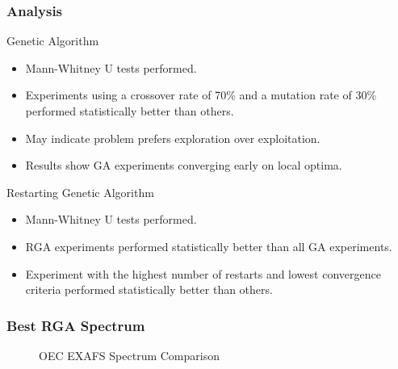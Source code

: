 \documentclass[10pt]{beamer}
\begin{document}
\begin{frame}
	\frametitle{Analysis}

	Genetic Algorithm

	\begin{itemize}
		\item Mann-Whitney U tests performed.
		\item Experiments using a crossover rate of 70\% and a mutation rate of 30\% performed statistically better than others.
		\item May indicate problem prefers exploration over exploitation.
		\item Results show GA experiments converging early on local optima.
	\end{itemize}

	Restarting Genetic Algorithm
	
	\begin{itemize}
		\item Mann-Whitney U tests performed.
		\item RGA experiments performed statistically better than all GA experiments.
		\item Experiment with the highest number of restarts and lowest convergence criteria performed statistically better than others.
	\end{itemize}

\end{frame}

\begin{frame}
	\frametitle{Best RGA Spectrum}

	\begin{figure}
		\caption{OEC EXAFS Spectrum Comparison}
	\end{figure}

\end{frame}
\end{document}
